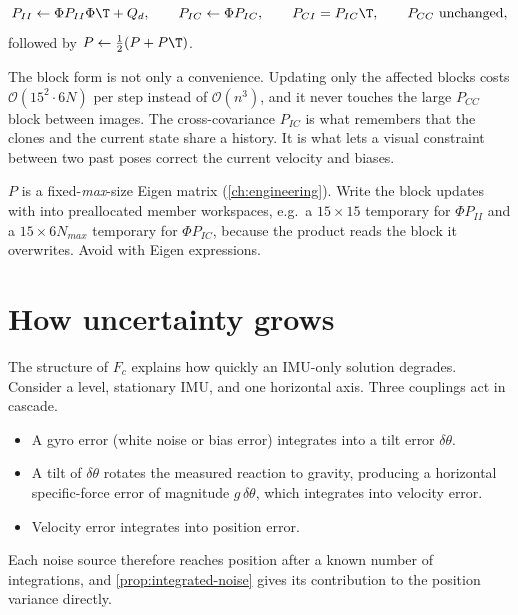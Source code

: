 \begin{convention}
\begin{equation}
  P_{II} \gets \Phi P_{II}\Phi\T + Q_d, \qquad P_{IC} \gets \Phi P_{IC}, \qquad P_{CI} = P_{IC}\T, \qquad P_{CC}\ \text{unchanged},
\end{equation}
followed by $P \gets \tfrac12(P + P\T)$.
\end{convention}

The block form is not only a convenience. Updating only the affected blocks costs $\mathcal{O}(15^2\cdot 6N)$ per step
instead of $\mathcal{O}(n^3)$, and it never touches the large $P_{CC}$ block between images. The cross-covariance
$P_{IC}$ is what remembers that the clones and the current state share a history. It is what lets a visual
constraint between two past poses correct the current velocity and biases.

\begin{implnote}
$P$ is a fixed-\emph{max}-size Eigen matrix (\cref{ch:engineering}). Write the block updates with  into
preallocated member workspaces, e.g.\ a $15\times15$ temporary for $\Phi P_{II}$ and a $15\times6N_{max}$ temporary for
$\Phi P_{IC}$, because the product reads the block it overwrites. Avoid  with Eigen expressions.
\end{implnote}

\section{How uncertainty grows}
\label{sec:cov-growth}

The structure of $F_c$ explains how quickly an IMU-only solution degrades. Consider a level, stationary IMU,
and one horizontal axis. Three couplings act in cascade.
\begin{itemize}
  \item A gyro error (white noise or bias error) integrates into a tilt error $\delta\theta$.
  \item A tilt of $\delta\theta$ rotates the measured reaction to gravity, producing a horizontal specific-force error of
        magnitude $g\,\delta\theta$, which integrates into velocity error.
  \item Velocity error integrates into position error.
\end{itemize}
Each noise source therefore reaches position after a known number of integrations, and
\cref{prop:integrated-noise} gives its contribution to the position variance directly.

